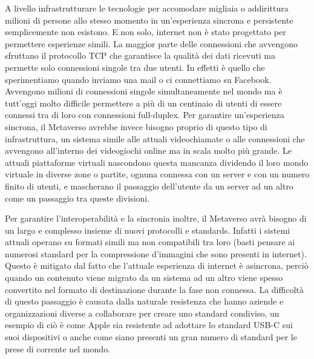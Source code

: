     A livello infrastrutturare le tecnologie per accomodare migliaia o addirittura milioni di persone allo stesso momento in un'esperienza sincrona e persistente semplicemente non esistono.
    E non solo, internet non è stato progettato per permettere esperienze simili.
    La maggior parte delle connessioni che avvengono sfruttano il protocollo TCP che garantisce la qualità dei dati ricevuti ma permette solo connessioni singole tra due utenti.
    In effetti è quello che sperimentiamo quando inviamo una mail o ci connettiamo su Facebook.
    Avvengono milioni di connessioni singole simultaneamente nel mondo ma è tutt'oggi molto difficile permettere a più di un centinaio di utenti di essere connessi tra di loro con connessioni full-duplex.
    Per garantire un'esperienza sincrona, il Metaverso avrebbe invece bisogno proprio di questo tipo di infrastruttura, un sistema simile alle attuali videochiamate o alle connessioni che avvengono all'interno dei videogiochi online ma in scala molto più grande.
    Le attuali piattaforme virtuali nascondono questa mancanza dividendo il loro mondo virtuale in diverse zone o partite, ognuna connessa con un server e con un numero finito di utenti, e mascherano il passaggio dell'utente da un server ad un altro come un passaggio tra queste divisioni.

    Per garantire l'interoperabilità e la sincronia inoltre, il Metaverso avrà bisogno di un largo e complesso insieme di nuovi protocolli e standards.
    Infatti i sistemi attuali operano su formati simili ma non compatibili tra loro (basti pensare ai numerosi standard per la compressione d'immagini che sono presenti in internet).
    Questo è mitigato dal fatto che l'attuale esperienza di internet è asincrona, perciò quando un contenuto viene migrato da un sistema ad un altro viene spesso convertito nel formato di destinazione durante la fase non connessa.
    La difficoltà di questo passaggio è causata dalla naturale resistenza che hanno aziende e organizzazioni diverse a collaborare per creare uno standard condiviso, un esempio di ciò è come Apple sia resistente ad adottare lo standard USB-C sui suoi dispositivi o anche come siano presenti un gran numero di standard per le prese di corrente nel mondo.

